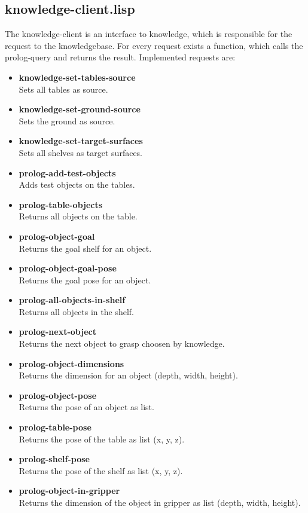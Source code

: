 \documentclass[main.tex]{subfiles}
\begin{document}
		\subsection{knowledge-client.lisp}
		The knowledge-client is an interface to knowledge, which is responsible for the request to the knowledgebase. For every request exists a function, which calls the prolog-query and returns the result. Implemented requests are:
			\begin{itemize}
				\item \textbf{knowledge-set-tables-source} \\ Sets all tables as source.
				\item \textbf{knowledge-set-ground-source} \\ Sets the ground as source.
				\item \textbf{knowledge-set-target-surfaces} \\ Sets all shelves as target surfaces.
			  \item \textbf{prolog-add-test-objects} \\ Adds test objects on the tables.
				\item \textbf{prolog-table-objects} \\ Returns all objects on the table.
				\item \textbf{prolog-object-goal} \\ Returns the goal shelf for an object.
			  \item \textbf{prolog-object-goal-pose} \\ Returns the goal pose for an object.
				\item \textbf{prolog-all-objects-in-shelf} \\ Returns all objects in the shelf.
				\item \textbf{prolog-next-object} \\ Returns the next object to grasp choosen by knowledge.
		    \item \textbf{prolog-object-dimensions} \\ Returns the dimension for an object (depth, width, height).
				\item \textbf{prolog-object-pose} \\ Returns the pose of an object as list.
				\item \textbf{prolog-table-pose} \\ Returns the pose of the table as list (x, y, z).
				\item \textbf{prolog-shelf-pose} \\ Returns the pose of the shelf as list (x, y, z).
				\item \textbf{prolog-object-in-gripper} \\ Returns the dimension of the object in gripper as list (depth, width, height).
			\end{itemize} 
\end{document}

